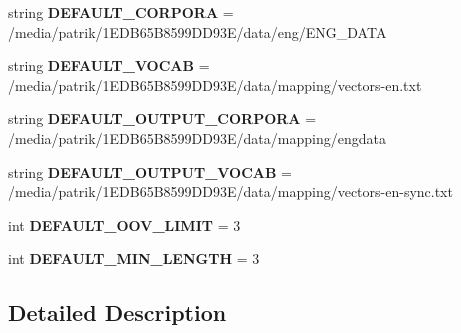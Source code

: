 \begin{DoxyCompactItemize}
\item 
string {\bfseries D\+E\+F\+A\+U\+L\+T\+\_\+\+C\+O\+R\+P\+O\+RA} = \textquotesingle{}/media/patrik/1\+E\+D\+B65\+B8599\+D\+D93\+E/data/eng/\+E\+N\+G\+\_\+\+D\+A\+T\+A\textquotesingle{}\hypertarget{namespacesynchronize_a1741eabe1f775bd983a84e68aa718b99}{}\label{namespacesynchronize_a1741eabe1f775bd983a84e68aa718b99}

\item 
string {\bfseries D\+E\+F\+A\+U\+L\+T\+\_\+\+V\+O\+C\+AB} = \textquotesingle{}/media/patrik/1\+E\+D\+B65\+B8599\+D\+D93\+E/data/mapping/vectors-\/en.\+txt\textquotesingle{}\hypertarget{namespacesynchronize_abf1c350b6077088bc5068db068c685d3}{}\label{namespacesynchronize_abf1c350b6077088bc5068db068c685d3}

\item 
string {\bfseries D\+E\+F\+A\+U\+L\+T\+\_\+\+O\+U\+T\+P\+U\+T\+\_\+\+C\+O\+R\+P\+O\+RA} = \textquotesingle{}/media/patrik/1\+E\+D\+B65\+B8599\+D\+D93\+E/data/mapping/engdata\textquotesingle{}\hypertarget{namespacesynchronize_a87afb0a6daab61179b155fd9f78dc911}{}\label{namespacesynchronize_a87afb0a6daab61179b155fd9f78dc911}

\item 
string {\bfseries D\+E\+F\+A\+U\+L\+T\+\_\+\+O\+U\+T\+P\+U\+T\+\_\+\+V\+O\+C\+AB} = \textquotesingle{}/media/patrik/1\+E\+D\+B65\+B8599\+D\+D93\+E/data/mapping/vectors-\/en-\/sync.\+txt\textquotesingle{}\hypertarget{namespacesynchronize_a0bb7f0d457f2b20b2b48de8e4bff08d8}{}\label{namespacesynchronize_a0bb7f0d457f2b20b2b48de8e4bff08d8}

\item 
int {\bfseries D\+E\+F\+A\+U\+L\+T\+\_\+\+O\+O\+V\+\_\+\+L\+I\+M\+IT} = 3\hypertarget{namespacesynchronize_a883c0963cd1b482e388c1d377315cf11}{}\label{namespacesynchronize_a883c0963cd1b482e388c1d377315cf11}

\item 
int {\bfseries D\+E\+F\+A\+U\+L\+T\+\_\+\+M\+I\+N\+\_\+\+L\+E\+N\+G\+TH} = 3\hypertarget{namespacesynchronize_af52e3a64d1dfc1d723ea3d84dd13015b}{}\label{namespacesynchronize_af52e3a64d1dfc1d723ea3d84dd13015b}

\end{DoxyCompactItemize}


\subsection{Detailed Description}
\begin{DoxyVerb}\end{DoxyVerb}
 